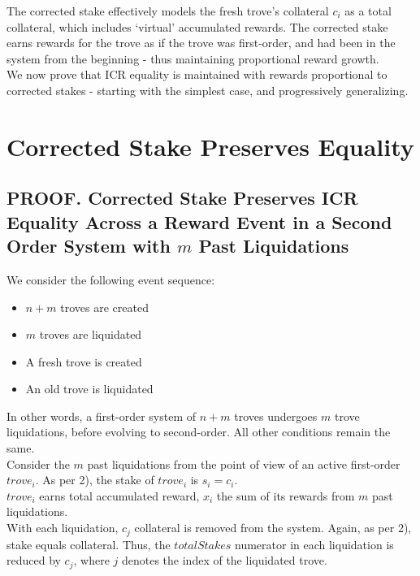 \documentclass[reqno]{article}
\begin{document}
The corrected stake effectively models the fresh trove’s collateral $c_i$ as a total collateral, which includes ‘virtual’ accumulated rewards. The corrected stake earns rewards for the trove as if the trove was first-order, and had been in the system from the beginning - thus maintaining proportional reward growth.\\

We now prove that ICR equality is maintained with rewards proportional to corrected stakes - starting with the simplest case, and progressively generalizing.

\section{Corrected Stake Preserves Equality}

\subsection{PROOF. Corrected Stake Preserves ICR Equality Across a Reward Event in a Second Order System with $m$ Past Liquidations}

We consider the following event sequence:

\begin{itemize}
  \item $n+m$ troves are created
  \item $m$ troves are liquidated
  \item A fresh trove is created
  \item An old trove is liquidated
\end{itemize}

\bigskip
In other words, a first-order system of $n+m$ troves undergoes $m$ trove liquidations, before evolving to second-order.  All other conditions remain the same.\\

Consider the $m$ past liquidations from the point of view of an active first-order $trove_i$. As per 2), the stake of $trove_i$ is $s_i = c_i$.\\

$trove_i$ earns total accumulated reward, $x_i$  the sum of its rewards from $m$ past liquidations.\\

With each liquidation, $c_j$ collateral is removed from the system. Again, as per 2), stake equals collateral. Thus, the $totalStakes$ numerator in each liquidation is reduced by $c_j$, where $j$ denotes the index of the liquidated trove.\\ 
\end{document}
